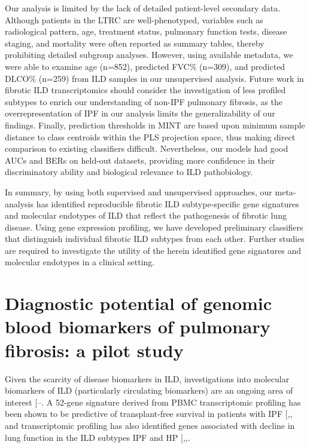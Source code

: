 \documentclass[
]{article}
\begin{document}
Our analysis is limited by the lack of detailed patient-level secondary data. Although patients in the LTRC are well-phenotyped, variables such as radiological pattern, age, treatment status, pulmonary function tests, disease staging, and mortality were often reported as summary tables, thereby prohibiting detailed subgroup analyses. However, using available metadata, we were able to examine age (n=852), predicted FVC\% (n=309), and predicted DLCO\% (n=259) from ILD samples in our unsupervised analysis. Future work in fibrotic ILD transcriptomics should consider the investigation of less profiled subtypes to enrich our understanding of non-IPF pulmonary fibrosis, as the overrepresentation of IPF in our analysis limits the generalizability of our findings. Finally, prediction thresholds in MINT are based upon minimum sample distance to class centroids within the PLS projection space, thus making direct comparison to existing classifiers difficult. Nevertheless, our models had good AUCs and BERs on held-out datasets, providing more confidence in their discriminatory ability and biological relevance to ILD pathobiology.

In summary, by using both supervised and unsupervised approaches, our meta-analysis has identified reproducible fibrotic ILD subtype-specific gene signatures and molecular endotypes of ILD that reflect the pathogenesis of fibrotic lung disease. Using gene expression profiling, we have developed preliminary classifiers that distinguish individual fibrotic ILD subtypes from each other. Further studies are required to investigate the utility of the herein identified gene signatures and molecular endotypes in a clinical setting.

\clearpage

\section{Diagnostic potential of genomic blood biomarkers of pulmonary fibrosis: a pilot study}\label{diagnostic-potential-of-genomic-blood-biomarkers-of-pulmonary-fibrosis-a-pilot-study}

\renewcommand{\thefigure}{3.\arabic{figure}}
\setcounter{figure}{0}
\renewcommand{\thetable}{3.\arabic{table}}
\setcounter{table}{0}
\renewcommand{\theequation}{3.\arabic{equation}}
\setcounter{equation}{0}

Given the scarcity of disease biomarkers in ILD, investigations into molecular biomarkers of ILD (particularly circulating biomarkers) are an ongoing area of interest {[}--\citeproc{ref-bowman_proteomic_2022}{99}{]}. A 52-gene signature derived from PBMC transcriptomic profiling has been shown to be predictive of transplant-free survival in patients with IPF {[},\citeproc{ref-herazo-maya_validating_2017}{100}{]}, and transcriptomic profiling has also identified genes associated with decline in lung function in the ILD subtypes IPF and HP {[},,\citeproc{ref-fernandez_perez_prognostic_2022}{102}{]}.
\end{document}
